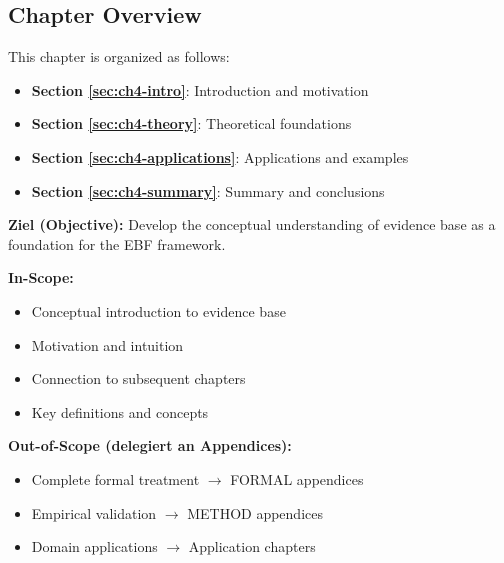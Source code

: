 \subsection*{Chapter Overview}

This chapter is organized as follows:

\begin{itemize}
\item \textbf{Section \ref{sec:ch4-intro}}: Introduction and motivation
\item \textbf{Section \ref{sec:ch4-theory}}: Theoretical foundations
\item \textbf{Section \ref{sec:ch4-applications}}: Applications and examples
\item \textbf{Section \ref{sec:ch4-summary}}: Summary and conclusions
\end{itemize}




\begin{tcolorbox}[
    colback=purple!5!white,
    colframe=purple!75!black,
    title={\textbf{Chapter Scope: Ziel / In-Scope / Out-of-Scope}},
    fonttitle=\bfseries
]

\textbf{Ziel (Objective):}
Develop the conceptual understanding of evidence base as a foundation for the EBF framework.

\vspace{0.3cm}
\textbf{In-Scope:}
\begin{itemize}[nosep]
    \item Conceptual introduction to evidence base
    \item Motivation and intuition
    \item Connection to subsequent chapters
    \item Key definitions and concepts
\end{itemize}

\vspace{0.3cm}
\textbf{Out-of-Scope (delegiert an Appendices):}
\begin{itemize}[nosep]
    \item Complete formal treatment $\rightarrow$ FORMAL appendices
    \item Empirical validation $\rightarrow$ METHOD appendices
    \item Domain applications $\rightarrow$ Application chapters
\end{itemize}

\end{tcolorbox}

